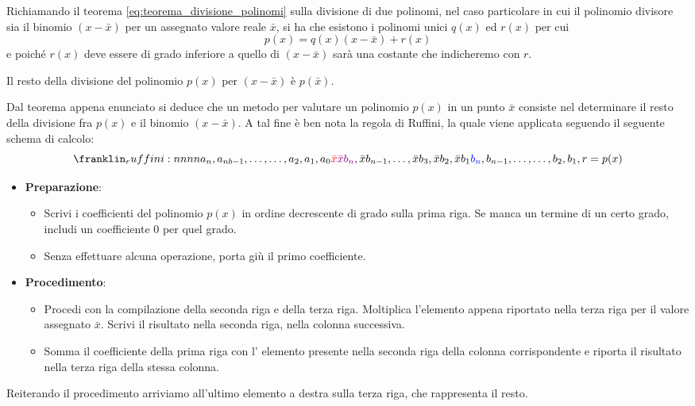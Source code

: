 \documentclass{article}
\begin{document}
Richiamando il teorema \ref{eq:teorema_divisione_polinomi} sulla divisione di
due polinomi, nel caso particolare in cui il polinomio divisore sia il
binomio $(x-\bar{x})$ per un assegnato valore reale $\bar{x}$, si ha che
esistono i polinomi unici $q(x)$ ed $r(x)$ per cui 
$$p(x)=q(x)(x-\bar{x})+r(x)$$
e poiché $r(x)$ deve essere di grado inferiore a quello di $(x-\bar{x})$ sarà
una costante che indicheremo con $r$.
\begin{theorem}
    Il resto della divisione del polinomio $p(x)$ per $(x-\bar{x})$ è $p(\bar{x})$.
\end{theorem}
Dal teorema appena enunciato si deduce che un metodo per valutare un polinomio
$p(x)$ in un punto $\bar{x}$ consiste nel determinare il resto della divisione
fra $p(x)$ e il binomio $(x-\bar{x})$. A tal fine è ben nota la regola di
Ruffini, la quale viene applicata seguendo il seguente schema di calcolo:
$$\ruffini{a_n,a_{nb-1},\ldots,\ldots,a_2,a_1,a_0}{\color{red}\bar{x}}{{\color{violet}\bar{x}b_n},\bar{x}b_{n-1},\ldots,\bar{x}b_3,\bar{x}b_2,\bar{x}b_1}{{\color{blue}b_n},
b_{n-1},\ldots,\ldots,b_2,b_1,r=p(x)}$$
\begin{itemize}
    \item \textbf{Preparazione}:
    \begin{itemize}
        \item Scrivi i coefficienti del polinomio $p(x)$ in ordine decrescente di
            grado sulla prima riga. Se manca un termine di un certo grado,
            includi un coefficiente 0 per quel grado.
        \item Senza effettuare alcuna operazione, porta giù il primo coefficiente.
    \end{itemize}
    \item \textbf{Procedimento}:
    \begin{itemize}
        \item Procedi con la compilazione della seconda riga e della terza riga.
            Moltiplica {\color{blue} l'elemento} appena riportato nella terza riga per il
            {\color{red} valore assegnato $\bar{x}$}. Scrivi il {\color{violet}risultato} 
            nella seconda riga, nella colonna successiva. 
        \item Somma il coefficiente della prima riga con l'
            {\color{violet}elemento} presente nella seconda riga della colonna
            corrispondente e riporta il risultato nella terza riga della stessa
            colonna.
    \end{itemize}
\end{itemize}
Reiterando il procedimento arriviamo all'ultimo elemento a destra sulla terza riga, 
che rappresenta il resto.
\end{document}
